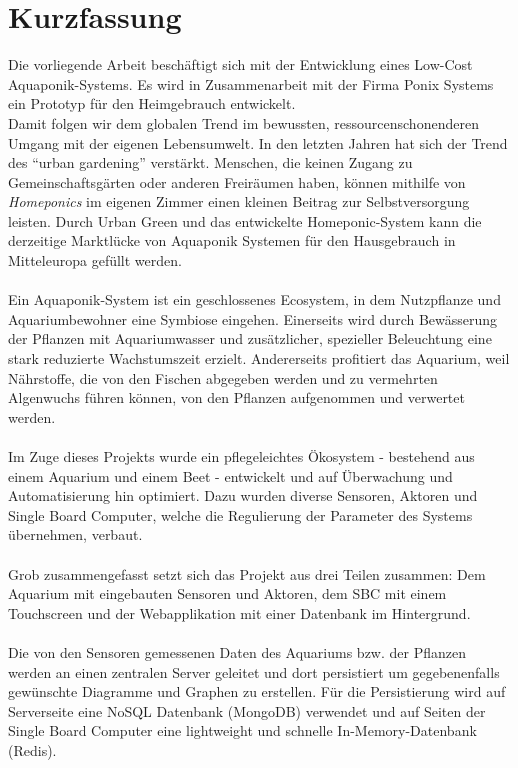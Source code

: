 \section*{Kurzfassung}
\setcounter{page}{5}
 Die vorliegende Arbeit beschäftigt sich mit der Entwicklung eines Low-Cost Aquaponik-Systems. Es wird in Zusammenarbeit mit der Firma Ponix Systems ein Prototyp für den Heimgebrauch entwickelt.\\ Damit folgen wir dem globalen Trend im bewussten, ressourcenschonenderen Umgang mit der eigenen Lebensumwelt. In den letzten Jahren hat sich der Trend des "`urban gardening"' verstärkt. Menschen, die keinen Zugang zu Gemeinschaftsgärten oder anderen Freiräumen haben, können mithilfe von \textit{Homeponics} im eigenen Zimmer einen kleinen Beitrag zur Selbstversorgung leisten. Durch Urban Green und das entwickelte Homeponic-System kann die derzeitige Marktlücke von Aquaponik Systemen für den Hausgebrauch in Mitteleuropa gefüllt werden.\\ \mbox{} \\ 
 Ein Aquaponik-System ist ein geschlossenes Ecosystem, in dem Nutzpflanze und Aquariumbewohner eine Symbiose eingehen. Einerseits wird durch Bewässerung der Pflanzen mit Aquariumwasser und zusätzlicher, spezieller Beleuchtung eine stark reduzierte Wachstumszeit erzielt. Andererseits profitiert das Aquarium, weil Nährstoffe, die von den Fischen abgegeben werden und zu vermehrten Algenwuchs führen können, von den Pflanzen aufgenommen und verwertet werden. \\ \mbox{} \\ 
 Im Zuge dieses Projekts wurde ein pflegeleichtes \"Okosystem - bestehend aus einem Aquarium und einem Beet - entwickelt und auf \"Uberwachung und Automatisierung hin optimiert. Dazu wurden diverse Sensoren, Aktoren und Single Board Computer, welche die Regulierung der Parameter des Systems \"ubernehmen, verbaut.\\ \mbox{} \\ 
 Grob zusammengefasst setzt sich das Projekt aus drei Teilen zusammen: Dem Aquarium mit eingebauten Sensoren und Aktoren, dem SBC mit einem Touchscreen und der Webapplikation mit einer Datenbank im Hintergrund. \\ \mbox{} \\
Die von den Sensoren gemessenen Daten des Aquariums bzw. der Pflanzen werden an einen zentralen Server geleitet und dort persistiert um gegebenenfalls gew\"unschte Diagramme und Graphen zu erstellen. F\"ur die Persistierung wird auf Serverseite eine NoSQL Datenbank (MongoDB) verwendet und auf Seiten der Single Board Computer eine lightweight und schnelle In-Memory-Datenbank (Redis).\\ \mbox{} \\
